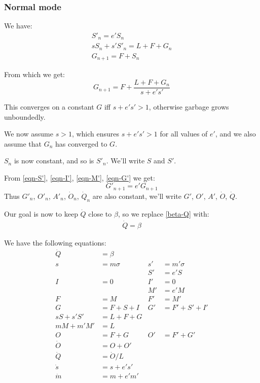 \documentclass{article}
\begin{document}
\subsubsection{Normal mode}

We have:
\begin{gather*}
S'_n = e'S_n \\
sS_n + s'S'_n = L + F + G_n \\
G_{n+1} = F + S_n
\end{gather*}

From which we get:
\begin{equation}
G_{n+1} = F + \frac{L + F + G_n}{s + e's'}
\end{equation}

This converges on a constant $G$ iff $s + e's' > 1$,
otherwise garbage grows unboundedly.

We now assume $s > 1$, which ensures $s + e's' > 1$ for all values of
$e'$, and we also assume that $G_n$ has converged to $G$.

$S_n$ is now constant, and so is $S'_n$. We'll write $S$ and $S'$.

From \eqref{eqn-S'}, \eqref{eqn-I'}, \eqref{eqn-M'}, \eqref{eqn-G'} we get:
\begin{equation}
G'_{n+1} = e' G_{n+1}
\end{equation}
Thus $G'_n$, $O'_n$, $A'_n$, $\dot{O}_n$, $\dot{Q}_n$ are
also constant, we'll write $G'$, $O'$, $A'$, $\dot{O}$,
$\dot{Q}$.

Our goal is now to keep $\dot{Q}$ close to $\beta$, so we replace
\eqref{beta-Q} with:
\begin{gather}
\dot{Q} = \beta \label{beta-Qdot}
\end{gather}

We have the following equations:
\begin{align*}
 \dot{Q} &= \beta \\
 s &= m \sigma  &   s' &= m' \sigma \\
   &            &   S' &= e' S \\
 I &= 0         &   I' &= 0 \\
   &            &   M' &= e' M \\
 F &= M         &   F' &= M' \\
 G &= F + S + I &   G' &= F' + S' + I' \\
 sS + s'S' &= L + F + G \\
 mM + m'M' &= L \\
 O &= F + G     &   O' &= F' + G' \\
 \dot{O} &= O + O' \\
 \dot{Q} &= \dot{O} / L \\
\dot{s} &= s + e' s' \\
\dot{m} &= m + e' m'
\end{align*}
\end{document}
